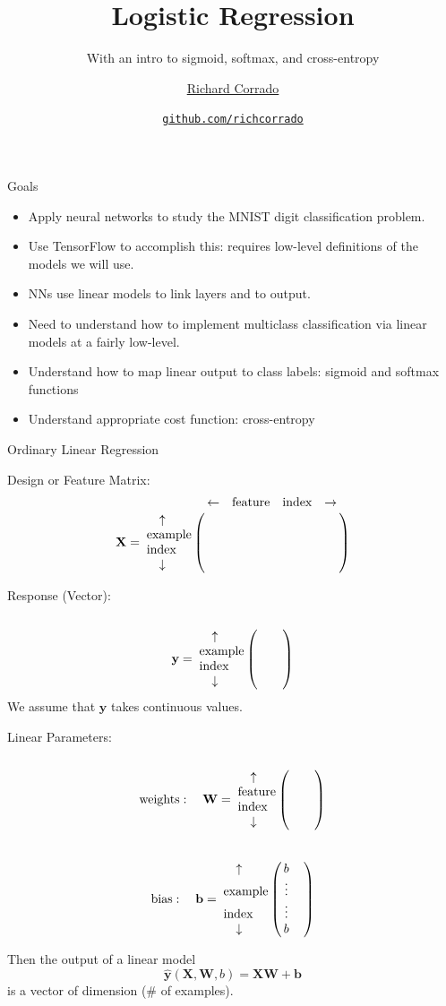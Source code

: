 \documentclass[12pt,t]{beamer}
\title{Logistic Regression}
\subtitle{With an intro to sigmoid, softmax, and cross-entropy}
\author{\href{http://richcorrado.github.io}{Richard Corrado}}
\institute{Fat Cat Machine Learning}
\date{\href{https://github.com/richcorrado}{\tt \scriptsize github.com/richcorrado}}
\begin{document}
{
	\frame{
		\titlepage
} } 
	


\begin{frame}{Goals}

\begin{itemize}
\item Apply neural networks to study the MNIST digit classification problem.
\item Use TensorFlow to accomplish this: requires low-level definitions of the models we will use.
\item NNs use linear models to link layers and to output.
\item Need to understand how to implement multiclass classification via linear models at a fairly low-level.
\item Understand how to map linear output to class labels: sigmoid and softmax functions
\item Understand appropriate cost function: cross-entropy
\end{itemize}


\end{frame}

\begin{frame}{Ordinary Linear Regression}

Design or Feature Matrix:
\vspace{-4mm}
$$ \mathbf{X} = \bordermatrix{ & \leftarrow & \text{feature} & \text{index} & \rightarrow \cr
		~~~\uparrow &  & &  & \cr
		\text{example} &  & & &  \cr
		\text{index} &  & & &\cr
 		~~~\downarrow &  & & &\cr
 		}$$

Response (Vector):
\vspace{-8mm}
$$ \mathbf{y} = \bordermatrix{ & ~~ &  \cr
		~~~\uparrow &    & \cr
		\text{example} &  &  \cr
		\text{index} &   &\cr
 		~~~\downarrow &   &\cr
 		}$$
We assume that $\mathbf{y} $ takes continuous values.
\end{frame}

\begin{frame}{}

Linear Parameters:
\vspace{-8mm}
$$ \text{weights}:~~~\mathbf{W} = \bordermatrix{ & ~~ &  \cr
		~~~\uparrow &    & \cr
		\text{feature} &  &  \cr
		\text{index} &   &\cr
 		~~~\downarrow &   &\cr
 		}$$

$$ \text{bias}:~~~\mathbf{b} =  \bordermatrix{ &  &  \cr
		~~~\uparrow &  b  & \cr
		\text{example} &  \vdots &  \cr
		\text{index} &  \vdots  &\cr
 		~~~\downarrow & b  &\cr
 		}$$

Then the output of a linear model
$$ \hat{\mathbf{y}}(\mathbf{X, W}, b) = \mathbf{X W} + \mathbf{b}$$
is a vector of dimension (\# of examples).
\end{frame}
\end{document}
